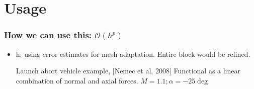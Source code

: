 \documentclass{beamer}
\begin{document}
\section[Usage]{Usage}

\begin{frame}%
\frametitle{How we can use this: \LARGE{$\mathcal{O}(h^p)$}}

\scriptsize
\begin{itemize}
\vspace{-25pt}
\item h: using error estimates for mesh adaptation. Entire block would be refined.
\begin{minipage}[t][0.7\textheight]{0.95\textwidth}
\vspace{-10pt}
\begin{exampleblock}{Launch abort vehicle example, [Nemec et al, 2008]}
\tiny
Functional as a linear combination of normal and axial forces. $M = 1.1; \alpha=-25\deg$
\vspace{-10pt}


\end{exampleblock}
\end{minipage}
\end{itemize}
\end{frame}
\end{document}
